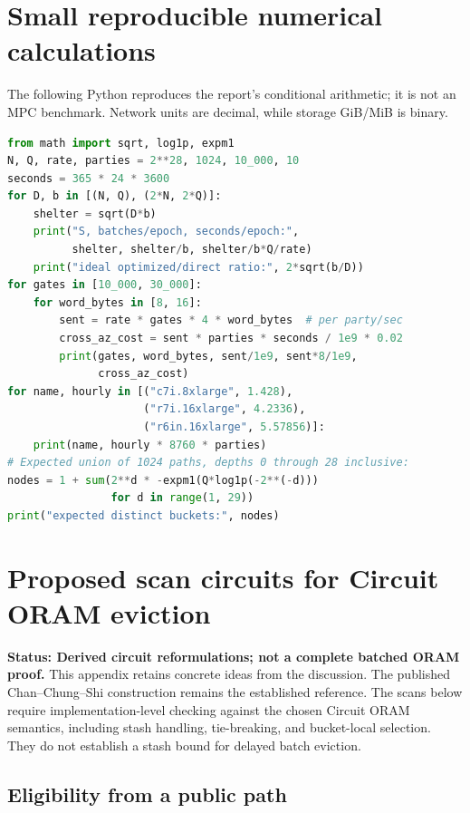 \documentclass[11pt]{article}
\newcommand{\status}[1]{\textbf{Status: #1.}}
\begin{document}
\section{Small reproducible numerical calculations}\label{app:calculator}

The following Python reproduces the report's conditional arithmetic; it is not
an MPC benchmark. Network units are decimal, while storage GiB/MiB is binary.

\begin{lstlisting}[language=Python]
from math import sqrt, log1p, expm1
N, Q, rate, parties = 2**28, 1024, 10_000, 10
seconds = 365 * 24 * 3600
for D, b in [(N, Q), (2*N, 2*Q)]:
    shelter = sqrt(D*b)
    print("S, batches/epoch, seconds/epoch:",
          shelter, shelter/b, shelter/b*Q/rate)
    print("ideal optimized/direct ratio:", 2*sqrt(b/D))
for gates in [10_000, 30_000]:
    for word_bytes in [8, 16]:
        sent = rate * gates * 4 * word_bytes  # per party/sec
        cross_az_cost = sent * parties * seconds / 1e9 * 0.02
        print(gates, word_bytes, sent/1e9, sent*8/1e9,
              cross_az_cost)
for name, hourly in [("c7i.8xlarge", 1.428),
                     ("r7i.16xlarge", 4.2336),
                     ("r6in.16xlarge", 5.57856)]:
    print(name, hourly * 8760 * parties)
# Expected union of 1024 paths, depths 0 through 28 inclusive:
nodes = 1 + sum(2**d * -expm1(Q*log1p(-2**(-d)))
                for d in range(1, 29))
print("expected distinct buckets:", nodes)
\end{lstlisting}

\section{Proposed scan circuits for Circuit ORAM eviction}\label{app:eviction}

\status{Derived circuit reformulations; not a complete batched ORAM proof}
This appendix retains concrete ideas from the discussion. The published
Chan--Chung--Shi construction remains the established reference. The scans below
require implementation-level checking against the chosen Circuit ORAM semantics,
including stash handling, tie-breaking, and bucket-local selection. They do not
establish a stash bound for delayed batch eviction.

\subsection{Eligibility from a public path}
\end{document}

